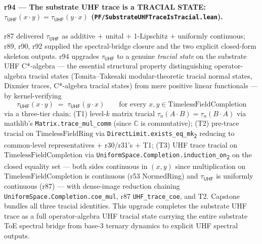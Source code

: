 \documentclass[11pt,a4paper]{amsart}
\theoremstyle{plain}
\theoremstyle{definition}
\begin{document}
\paragraph{r94 --- The substrate UHF trace is a TRACIAL STATE: $\tau_{\textsf{UHF}}(x \cdot y) = \tau_{\textsf{UHF}}(y \cdot x)$ (\texttt{PF/SubstrateUHFTraceIsTracial.lean}).} r87 delivered $\tau_{\textsf{UHF}}$ as additive $+$ unital $+$ 1-Lipschitz $+$ uniformly continuous; r89, r90, r92 supplied the spectral-bridge closure and the two explicit closed-form skeleton outputs. r94 upgrades $\tau_{\textsf{UHF}}$ to a genuine \emph{tracial state} on the substrate UHF C*-algebra --- the essential structural property distinguishing operator-algebra tracial states (Tomita--Takesaki modular-theoretic tracial normal states, Dixmier traces, C*-algebra tracial states) from mere positive linear functionals --- by kernel-verifying
\[
\boxed{\; \tau_{\textsf{UHF}}(x \cdot y) \;=\; \tau_{\textsf{UHF}}(y \cdot x) \qquad \text{for every } x, y \in \mathrm{TimelessFieldCompletion} \;}
\]
via a three-tier chain: (T1) level-$k$ matrix tracial  $\tau_n(A \cdot B) = \tau_n(B \cdot A)$ via mathlib's \texttt{Matrix.trace\_mul\_comm} (since $\mathbb{C}$ is commutative); (T2) pre-trace tracial on $\mathrm{TimelessFieldRing}$  via \texttt{DirectLimit.exists\_eq\_mk\textsubscript{2}} reducing to common-level representatives $+$ r30/r31's  $+$ T1; (T3) UHF trace tracial on $\mathrm{TimelessFieldCompletion}$  via \texttt{UniformSpace.Completion.induction\_on\textsubscript{2}} on the closed equality set --- both sides continuous in $(x, y)$ since multiplication on $\mathrm{TimelessFieldCompletion}$ is continuous (r53 NormedRing) and $\tau_{\textsf{UHF}}$ is uniformly continuous (r87) --- with dense-image reduction chaining \texttt{UniformSpace.Completion.coe\_mul}, r87 \texttt{UHF\_trace\_coe}, and T2. Capstone  bundles all three tracial identities. This upgrade completes the substrate UHF trace as a full operator-algebra UHF tracial state carrying the entire substrate ToE spectral bridge from base-3 ternary dynamics to explicit UHF spectral outputs.
\end{document}
